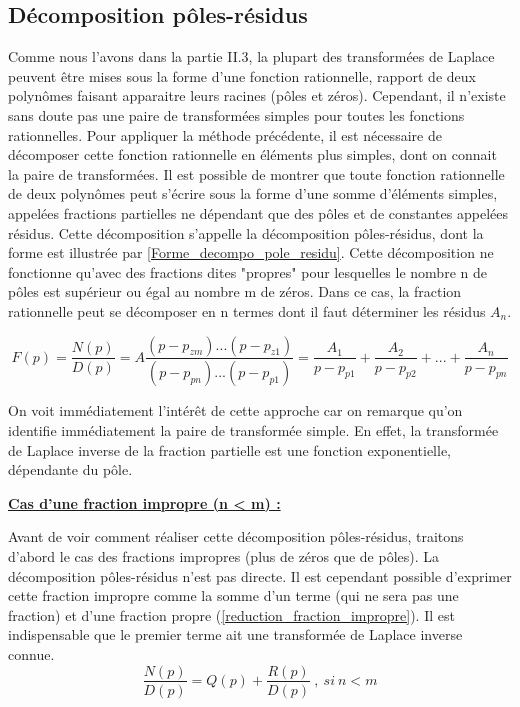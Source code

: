 	\subsection{Décomposition pôles-résidus}
	Comme nous l'avons dans la partie II.3, la plupart des transformées de Laplace peuvent être mises sous la forme d'une fonction rationnelle, rapport de deux polynômes faisant apparaitre leurs racines (pôles et zéros). Cependant, il n'existe sans doute pas une paire de transformées simples pour toutes les fonctions rationnelles. Pour appliquer la méthode précédente, il est nécessaire de décomposer cette fonction rationnelle en éléments plus simples, dont on connait la paire de transformées.
	Il est possible de montrer que toute fonction rationnelle de deux polynômes peut s'écrire sous la forme d'une somme d'éléments simples, appelées fractions partielles ne dépendant que des pôles et de constantes appelées résidus. Cette décomposition s'appelle la décomposition pôles-résidus, dont la forme est illustrée par \ref{Forme_decompo_pole_residu}. Cette décomposition ne fonctionne qu'avec des fractions dites "propres" pour lesquelles le nombre n de pôles est supérieur ou égal au nombre m de zéros. Dans ce cas, la fraction rationnelle peut se décomposer en n termes dont il faut déterminer les résidus $A_{n}$.
	
	\begin{equation}\label{Forme_decompo_pole_residu}
	F(p)=\frac{N(p)}{D(p)}=A\frac{(p-p_{zm})...(p-p_{z1})}{(p-p_{pn})...(p-p_{p1})}=\frac{A_{1}}{p-p_{p1}}+\frac{A_{2}}{p-p_{p2}}+...+\frac{A_{n}}{p-p_{pn}}
	\end{equation}
	
	On voit immédiatement l'intérêt de cette approche car on remarque qu'on identifie immédiatement la paire de transformée simple. En effet, la transformée de Laplace inverse de la fraction partielle est une fonction exponentielle, dépendante du pôle.
	
	\vspace{0.5\baselineskip}
	
	\textbf{\underline{Cas d'une fraction impropre (n < m) :}}
	
	Avant de voir comment réaliser cette décomposition pôles-résidus, traitons d'abord le cas des fractions impropres (plus de zéros que de pôles). La décomposition pôles-résidus n'est pas directe. Il est cependant possible d'exprimer cette fraction impropre comme la somme d'un terme (qui ne sera pas une fraction) et d'une fraction propre (\ref{reduction_fraction_impropre}). Il est indispensable que le premier terme ait une transformée de Laplace inverse connue.
	\begin{equation}\label{reduction_fraction_impropre}
	\frac{N(p)}{D(p)}=Q(p)+\frac{R(p)}{D(p)}~,~si~n<m
	\end{equation}
	
